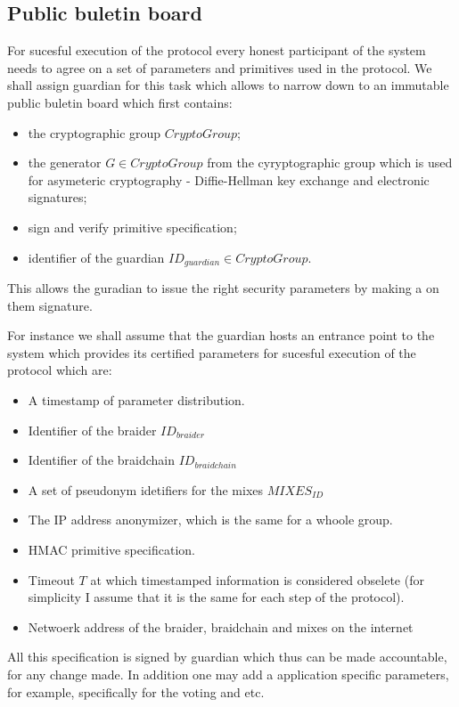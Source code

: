 \documentclass[12pt]{article}
\begin{document}
\subsection*{Public buletin board}

For sucesful execution of the protocol every honest participant of the system needs to agree on a set of parameters and primitives used in the protocol. We shall assign guardian for this task which allows to narrow down to an immutable public buletin board which first contains:
\begin{itemize}
\item the cryptographic group $CryptoGroup$;
\item the generator $G \in CryptoGroup$ from the cyryptographic group which is used for asymeteric cryptography - Diffie-Hellman key exchange and electronic signatures;
\item sign and verify primitive specification;
\item identifier of the guardian $ID_{guardian} \in CryptoGroup$.
\end{itemize}
This allows the guradian to issue the right security parameters by making a on them signature. 

For instance we shall assume that the guardian hosts an entrance point to the system which provides its certified parameters for sucesful execution of the protocol which are:
\begin{itemize}
\item A timestamp of parameter distribution.
\item Identifier of the braider $ID_{braider}$
\item Identifier of the braidchain $ID_{braidchain}$
\item A set of pseudonym idetifiers for the mixes $MIXES_{ID}$
\item The IP address anonymizer, which is the same for a whoole group.
\item HMAC primitive specification. 
\item Timeout $T$ at which timestamped information is considered obselete (for simplicity I assume that it is the same for each step of the protocol).
\item Netwoerk address of the braider, braidchain and mixes on the internet
\end{itemize}
All this specification is signed by guardian which thus can be made accountable, for any change made. In addition one may add a application specific parameters, for example, specifically for the voting and etc.
\end{document}
